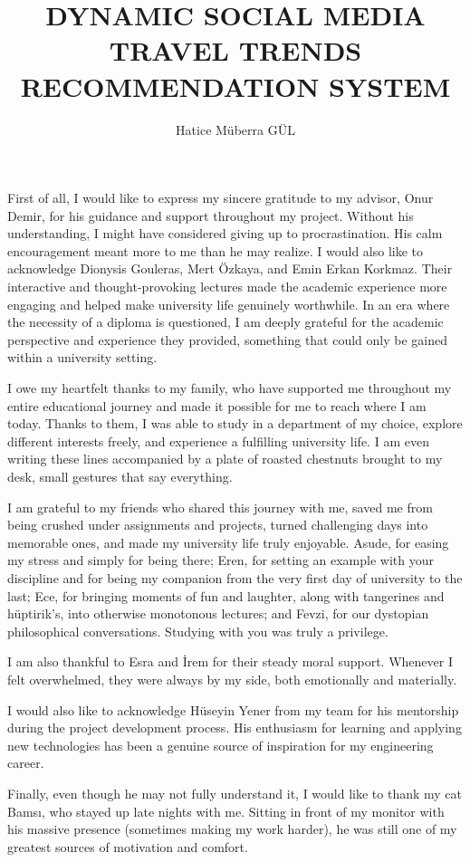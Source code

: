 \documentclass[a4paper,12pt]{report}
\title{DYNAMIC SOCIAL MEDIA TRAVEL TRENDS RECOMMENDATION SYSTEM}
\author{Hatice Müberra GÜL}
\begin{document}


\makecoverpage
    
\clearpage\mbox{}
\clearpage    
\addtocounter{page}{-1}
    
\makeapprovalpage

\begin{acknowledgements}
First of all, I would like to express my sincere gratitude to my advisor, Onur Demir, for his guidance and support throughout my project. Without his understanding, I might have considered giving up to procrastination. His calm encouragement meant more to me than he may realize. I would also like to acknowledge Dionysis Gouleras, Mert Özkaya, and Emin Erkan Korkmaz. Their interactive and thought-provoking lectures made the academic experience more engaging and helped make university life genuinely worthwhile. In an era where the necessity of a diploma is questioned, I am deeply grateful for the academic perspective and experience they provided, something that could only be gained within a university setting.

I owe my heartfelt thanks to my family, who have supported me throughout my entire educational journey and made it possible for me to reach where I am today. Thanks to them, I was able to study in a department of my choice, explore different interests freely, and experience a fulfilling university life. I am even writing these lines accompanied by a plate of roasted chestnuts brought to my desk, small gestures that say everything.

I am grateful to my friends who shared this journey with me, saved me from being crushed under assignments and projects, turned challenging days into memorable ones, and made my university life truly enjoyable. Asude, for easing my stress and simply for being there; Eren, for setting an example with your discipline and for being my companion from the very first day of university to the last; Ece, for bringing moments of fun and laughter, along with tangerines and hüptirik's, into otherwise monotonous lectures; and Fevzi, for our dystopian philosophical conversations. Studying with you was truly a privilege.

I am also thankful to Esra and İrem for their steady moral support. Whenever I felt overwhelmed, they were always by my side, both emotionally and materially.

I would also like to acknowledge Hüseyin Yener from my team for his mentorship during the project development process. His enthusiasm for learning and applying new technologies has been a genuine source of inspiration for my engineering career.

Finally, even though he may not fully understand it, I would like to thank my cat Bamsı, who stayed up late nights with me. Sitting in front of my monitor with his massive presence (sometimes making my work harder), he was still one of my greatest sources of motivation and comfort.
\end{acknowledgements}
\end{document}
